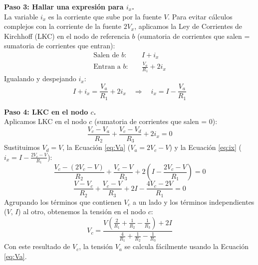 \documentclass[12pt, a4paper]{article}
\begin{document}
\textbf{Paso 3: Hallar una expresión para $i_x$.} \\
La variable $i_x$ es la corriente que sube por la fuente $V$. Para evitar cálculos complejos con la corriente de la fuente $2V_x$, aplicamos la Ley de Corrientes de Kirchhoff (LKC) en el nodo de referencia $b$ (sumatoria de corrientes que salen = sumatoria de corrientes que entran):
\begin{align*}
    \text{Salen de } b: \quad & I + i_x \\
    \text{Entran a } b: \quad & \frac{V_a}{R_1} + 2i_x
\end{align*}
Igualando y despejando $i_x$:
\begin{equation}
    I + i_x = \frac{V_a}{R_1} + 2i_x \quad \Rightarrow \quad i_x = I - \frac{V_a}{R_1} \tag{4} \label{eq:ix}
\end{equation}

\textbf{Paso 4: LKC en el nodo $c$.} \\
Aplicamos LKC en el nodo $c$ (sumatoria de corrientes que salen = 0):
\begin{equation}
    \frac{V_c - V_a}{R_2} + \frac{V_c - V_d}{R_3} + 2i_x = 0
\end{equation}
Sustituimos $V_d = V$, la Ecuación \eqref{eq:Va} ($V_a = 2V_c - V$) y la Ecuación \eqref{eq:ix} ($i_x = I - \frac{2V_c - V}{R_1}$):
\begin{equation*}
    \frac{V_c - (2V_c - V)}{R_2} + \frac{V_c - V}{R_3} + 2\left(I - \frac{2V_c - V}{R_1}\right) = 0
\end{equation*}
\begin{equation*}
    \frac{V - V_c}{R_2} + \frac{V_c - V}{R_3} + 2I - \frac{4V_c - 2V}{R_1} = 0
\end{equation*}
Agrupando los términos que contienen $V_c$ a un lado y los términos independientes ($V$, $I$) al otro, obtenemos la tensión en el nodo $c$:
\begin{equation}
    V_c = \frac{V \left( \frac{2}{R_1} + \frac{1}{R_2} - \frac{1}{R_3} \right) + 2I}{\frac{4}{R_1} + \frac{1}{R_2} - \frac{1}{R_3}}
\end{equation}
Con este resultado de $V_c$, la tensión $V_a$ se calcula fácilmente usando la Ecuación \eqref{eq:Va}.
\end{document}
